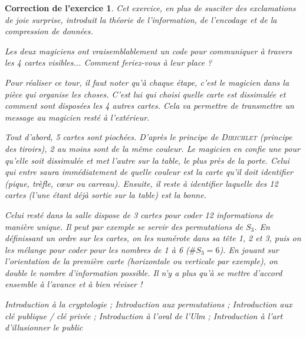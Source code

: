 \documentclass[12pt]{article}
\theoremstyle{break}
\newtheorem{cor}{Correction de l'exercice}
\begin{document}
\begin{cor}
\textit{Cet exercice, en plus de susciter des exclamations de joie surprise, introduit la théorie de l'information, de l'encodage et de la compression de données.}\newline

\textit{Les deux magiciens ont vraisemblablement un code pour communiquer à travers les 4 cartes visibles... Comment feriez-vous à leur place ?}\newline

Pour réaliser ce tour, il faut noter qu'à chaque étape, c'est le magicien dans la pièce qui organise les choses. C'est lui qui choisi quelle carte est dissimulée et comment sont disposées les 4 autres cartes. Cela va permettre de transmettre un message au magicien resté à l'extérieur.

Tout d'abord, 5 cartes sont piochées. D'après le principe de \textsc{Dirichlet} (principe des tiroirs), 2 au moins sont de la même couleur. Le magicien en confie une pour qu'elle soit dissimulée et met l'autre sur la table, le plus près de la porte. Celui qui entre saura immédiatement de quelle couleur est la carte qu'il doit identifier (pique, trèfle, cœur ou carreau). Ensuite, il reste à identifier laquelle des 12 cartes (l'une étant déjà sortie sur la table) est la bonne.

Celui resté dans la salle dispose de 3 cartes pour coder 12 informations de manière unique. Il peut par exemple se servir des permutations de $S_{3}$. En définissant un ordre sur les cartes, on les numérote dans sa tête 1, 2 et 3, puis on les mélange pour coder pour les nombres de 1 à 6 ($\#S_{3} = 6$). En jouant sur l'orientation de la première carte (horizontale ou verticale par exemple), on double le nombre d'information possible. Il n'y a plus qu'à se mettre d'accord ensemble à l'avance et à bien réviser !\newline

\textit{Introduction à la cryptologie ; Introduction aux permutations ; Introduction aux clé publique / clé privée ; Introduction à l'oral de l'Ulm ; Introduction à l'art d'illusionner le public}
\end{cor}
\end{document}

